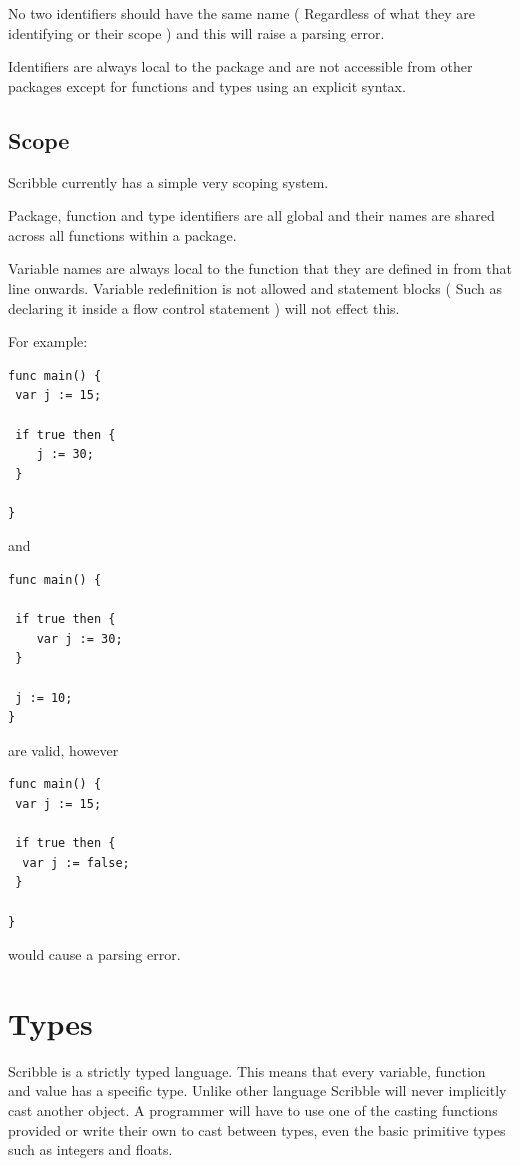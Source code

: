 \documentclass[]{final_report}
\begin{document}
No two identifiers should have the same name ( Regardless of what they are identifying or their scope ) and this will raise a parsing error.

Identifiers are always local to the package and are not accessible from other packages except for functions and types using an explicit syntax.

\subsection{Scope}

Scribble currently has a simple very scoping system.

Package, function and type identifiers are all global and their names are shared across all functions within a package.

Variable names are always local to the function that they are defined in from that line onwards. Variable redefinition is not allowed and statement blocks ( Such as declaring it inside a flow control statement ) will not effect this.

For example:
\begin{verbatim}
func main() {
 var j := 15;
 
 if true then {
 	j := 30;
 }

}
\end{verbatim}
and
\begin{verbatim}
func main() {
 
 if true then {
 	var j := 30;
 }
 
 j := 10;
}
\end{verbatim}
are valid, however
\begin{verbatim}
func main() {
 var j := 15;
 
 if true then { 
  var j := false; 
 }

}
\end{verbatim}
would cause a parsing error.

\section{Types}

Scribble is a strictly typed language. This means that every variable, function and value has a specific type. Unlike other language Scribble will never implicitly cast another object. A programmer will have to use one of the casting functions provided or write their own to cast between types, even the basic primitive types such as integers and floats.
\end{document}
